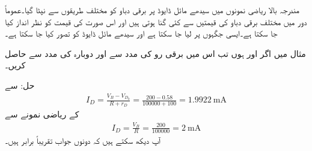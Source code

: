 
مندرجہ بالا ریاضی نمونوں میں سیدھے مائل ڈایوڈ پر برقی دباو  کو مختلف طریقوں سے نپٹا گیا۔عموماً دور میں مختلف برقی دباو کی قیمتیں  سے کئی گنا ہوتی ہیں اور اس صورت  کی قیمت کو نظر انداز کیا جا سکتا ہے۔ایسی جگہوں پر  لیا جا سکتا ہے اور سیدھے مائل ڈایوڈ کو   تصور کیا جا سکتا ہے۔

مثال   میں اگر  اور  ہوں تب اس میں برقی رو  کی مدد سے اور دوبارہ  کی مدد سے حاصل کریں۔

حل:  سے
\begin{align*}
I_D=\frac{V_B-V_{D_0}}{R+r_D}=\frac{200-0.58}{100000+100}=\SI{1.9922}{\milli \ampere}
\end{align*}
 کے ریاضی نمونے سے
\begin{align*}
I_D=\frac{V_B}{R}=\frac{200}{100000}=\SI{2}{\milli \ampere}
\end{align*}
آپ دیکھ سکتے ہیں کہ دونوں جواب تقریباً برابر ہیں۔


